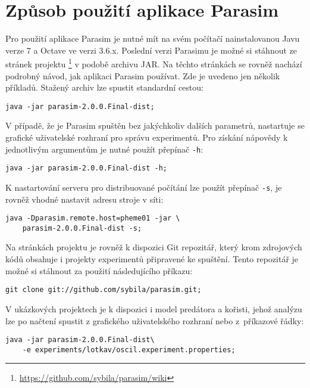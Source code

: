 \chapter{Způsob použití aplikace Parasim}\label{appendix:usage}

Pro použití aplikace Parasim je nutné mít na svém počítačí nainstalovanou Javu verze 7
a Octave ve verzi 3.6.x. Poslední verzi  Parasimu je možné si stáhnout ze
stránek projektu \footnote{\url{https://github.com/sybila/parasim/wiki}} v podobě
archivu JAR. Na těchto stránkách se rovněž nachází podrobný návod, jak aplikaci Parasim používat.
Zde je uvedeno jen několik příkladů. Stažený archiv lze spustit standardní cestou:

\begin{lstlisting}[style=Bash]
java -jar parasim-2.0.0.Final-dist;
\end{lstlisting}

V případě, že je Parasim spuštěn bez jakýchkoliv dalších parametrů, nastartuje se grafické
uživatelské rozhraní pro správu experimentů. Pro získání nápovědy k jednotlivým argumentům
je nutné použít přepínač \texttt{-h}:

\begin{lstlisting}[style=Bash]
java -jar parasim-2.0.0.Final-dist -h;
\end{lstlisting}

K nastartování serveru pro distribuované počítání lze použít přepínač \texttt{-s},
je rovněž vhodné nastavit adresu stroje v síti:

\begin{lstlisting}[style=Bash]
java -Dparasim.remote.host=pheme01 -jar \
	parasim-2.0.0.Final-dist -s;
\end{lstlisting}

Na stránkách projektu je rovněž k dispozici Git repozitář, který krom zdrojových kódů obsahuje
i projekty experimentů připravené ke spuštění. Tento repozitář je možné si stáhnout
za použití následujícího příkazu:

\begin{lstlisting}[style=Bash]
git clone git://github.com/sybila/parasim.git;
\end{lstlisting}

V ukázkových projektech je k dispozici i model predátora a kořisti, jehož analýzu
lze po načtení spustit z grafického uživatelského rozhraní nebo z~příkazové řádky:

\begin{lstlisting}[style=Bash]
java -jar parasim-2.0.0.Final-dist\
	-e experiments/lotkav/oscil.experiment.properties;
\end{lstlisting}
